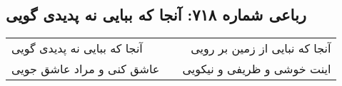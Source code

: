 \begin{center}
\section*{رباعی شماره ۷۱۸: آنجا که ببایی نه پدیدی گویی}
\label{sec:sh718}
\begin{longtable}{l p{0.5cm} r}
آنجا که ببایی نه پدیدی گویی
&&
آنجا که نبایی از زمین بر رویی
\\
عاشق کنی و مراد عاشق جویی
&&
اینت خوشی و ظریفی و نیکویی
\\
\end{longtable}
\end{center}
